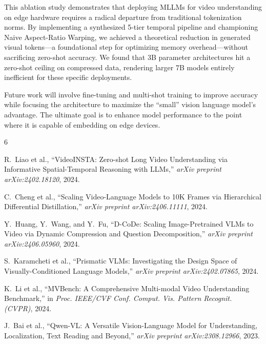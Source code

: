\documentclass[conference]{IEEEtran}
\begin{document}
This ablation study demonstrates that deploying MLLMs for video
understanding on edge hardware requires a radical departure from
traditional tokenization norms. By implementing a synthesized 5-tier
temporal pipeline and championing Naive Aspect-Ratio Warping, we achieved
a theoretical reduction in generated visual tokens---a foundational step
for optimizing memory overhead---without sacrificing zero-shot accuracy.
We found that 3B parameter architectures hit a zero-shot ceiling on
compressed data, rendering larger 7B models entirely inefficient for
these specific deployments.

Future work will involve fine-tuning and multi-shot training to improve
accuracy while focusing the architecture to maximize the ``small'' vision
language model's advantage. The ultimate goal is to enhance model
performance to the point where it is capable of embedding on edge devices.

\balance  %


\begin{thebibliography}{6}

R.~Liao et al.,
``VideoINSTA: Zero-shot Long Video Understanding via Informative
Spatial-Temporal Reasoning with LLMs,''
\textit{arXiv preprint arXiv:2402.18120}, 2024.

C.~Cheng et al.,
``Scaling Video-Language Models to 10K Frames via Hierarchical
Differential Distillation,''
\textit{arXiv preprint arXiv:2406.11111}, 2024.

Y.~Huang, Y.~Wang, and Y.~Fu,
``D-CoDe: Scaling Image-Pretrained VLMs to Video via Dynamic Compression
and Question Decomposition,''
\textit{arXiv preprint arXiv:2406.05960}, 2024.

S.~Karamcheti et al.,
``Prismatic VLMs: Investigating the Design Space of Visually-Conditioned
Language Models,''
\textit{arXiv preprint arXiv:2402.07865}, 2024.

K.~Li et al.,
``MVBench: A Comprehensive Multi-modal Video Understanding Benchmark,''
in \textit{Proc. IEEE/CVF Conf. Comput. Vis. Pattern Recognit. (CVPR)},
2024.

J.~Bai et al.,
``Qwen-VL: A Versatile Vision-Language Model for Understanding,
Localization, Text Reading and Beyond,''
\textit{arXiv preprint arXiv:2308.12966}, 2023.

\end{thebibliography}
\end{document}
